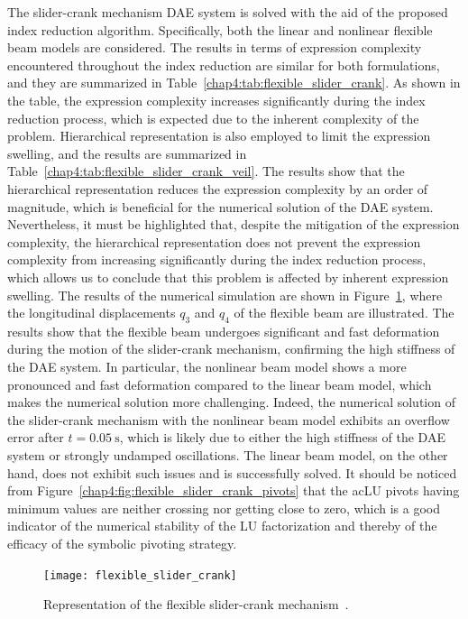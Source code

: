 The slider-crank mechanism \ac{DAE} system is solved with the aid of the proposed index reduction algorithm. Specifically, both the linear and nonlinear flexible beam models are considered. The results in terms of expression complexity encountered throughout the index reduction are similar for both formulations, and they are summarized in Table~\ref{chap4:tab:flexible_slider_crank}. As shown in the table, the expression complexity increases significantly during the index reduction process, which is expected due to the inherent complexity of the problem. Hierarchical representation is also employed to limit the expression swelling, and the results are summarized in Table~\ref{chap4:tab:flexible_slider_crank_veil}. The results show that the hierarchical representation reduces the expression complexity by an order of magnitude, which is beneficial for the numerical solution of the \ac{DAE} system. Nevertheless, it must be highlighted that, despite the mitigation of the expression complexity, the hierarchical representation does not prevent the expression complexity from increasing significantly during the index reduction process, which allows us to conclude that this problem is affected by inherent expression swelling. The results of the numerical simulation are shown in Figure~\ref{chap4:fig:flexible_slider_crank}, where the longitudinal displacements $q_3$ and $q_4$ of the flexible beam are illustrated. The results show that the flexible beam undergoes significant and fast deformation during the motion of the slider-crank mechanism, confirming the high stiffness of the \ac{DAE} system. In particular, the nonlinear beam model shows a more pronounced and fast deformation compared to the linear beam model, which makes the numerical solution more challenging. Indeed, the numerical solution of the slider-crank mechanism with the nonlinear beam model exhibits an overflow error after $t = \SI{0.05}{\second}$, which is likely due to either the high stiffness of the \ac{DAE} system or strongly undamped oscillations. The linear beam model, on the other hand, does not exhibit such issues and is successfully solved. It should be noticed from Figure~\ref{chap4:fig:flexible_slider_crank_pivots} that the ac{LU} pivots having minimum values are neither crossing nor getting close to zero, which is a good indicator of the numerical stability of the \ac{LU} factorization and thereby of the efficacy of the symbolic pivoting strategy.

\begin{figure}[htb]
  \centering
  \texttt{[image: flexible\_slider\_crank]}
  \caption{Representation of the flexible slider-crank mechanism~\cite{lioen1998test, mazzia2008test}.}
  \label{chap4:fig:flexible_slider_crank}
\end{figure}

